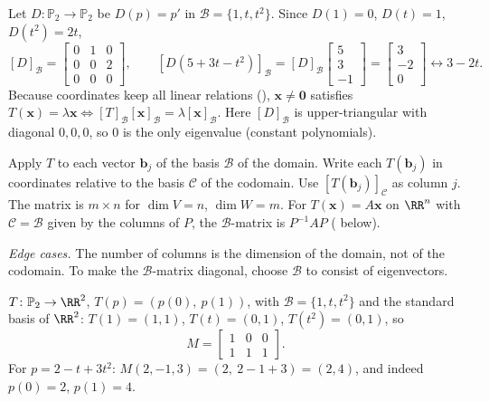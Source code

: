 \documentclass[10pt]{scrartcl}
\newcommand{\vv}[1]{\mathbf{#1}}
\begin{document}
\begin{example*}
  Let $D\colon\mathbb P_2\to\mathbb P_2$ be $D(p)=p'$ in $\mathcal B=\{1,t,t^2\}$. Since $D(1)=0$, $D(t)=1$, $D(t^2)=2t$,
  \[
    [D]_{\mathcal B} = \begin{bmatrix}0&1&0\\0&0&2\\0&0&0\end{bmatrix}, \qquad
    [D(5+3t-t^2)]_{\mathcal B} = [D]_{\mathcal B}\begin{bmatrix}5\\3\\-1\end{bmatrix} = \begin{bmatrix}3\\-2\\0\end{bmatrix}\leftrightarrow 3-2t.
  \]
  Because coordinates keep all linear relations (), $\vv x\neq\vv 0$ satisfies $T(\vv x)=\lambda\vv x \iff [T]_{\mathcal B}[\vv x]_{\mathcal B}=\lambda[\vv x]_{\mathcal B}$. Here $[D]_{\mathcal B}$ is upper-triangular with diagonal $0,0,0$, so $0$ is the only eigenvalue (constant polynomials).
\end{example*}

\begin{steps}
  \ii Apply $T$ to each vector $\vv b_j$ of the basis $\mathcal B$ of the domain.
  \ii Write each $T(\vv b_j)$ in coordinates relative to the basis $\mathcal C$ of the codomain.
  \ii Use $[T(\vv b_j)]_{\mathcal C}$ as column $j$. The matrix is $m\times n$ for $\dim V=n$, $\dim W=m$.
  \ii For $T(\vv x)=A\vv x$ on $\RR^n$ with $\mathcal C=\mathcal B$ given by the columns of $P$, the $\mathcal B$-matrix is $P^{-1}AP$ ( below).
\end{steps}
\emph{Edge cases.} The number of columns is the dimension of the domain, not of the codomain. To make the $\mathcal B$-matrix diagonal, choose $\mathcal B$ to consist of eigenvectors.

\begin{example*}
$T\colon\mathbb P_2\to\RR^2$, $T(p)=(p(0),\ p(1))$, with $\mathcal B=\{1,t,t^2\}$ and the standard basis of $\RR^2$: $T(1)=(1,1)$, $T(t)=(0,1)$, $T(t^2)=(0,1)$, so
\[
  M=\begin{bmatrix}1&0&0\\1&1&1\end{bmatrix}.
\]
For $p=2-t+3t^2$: $M(2,-1,3)=(2,\ 2-1+3)=(2,4)$, and indeed $p(0)=2$, $p(1)=4$.
\end{example*}
\end{document}
